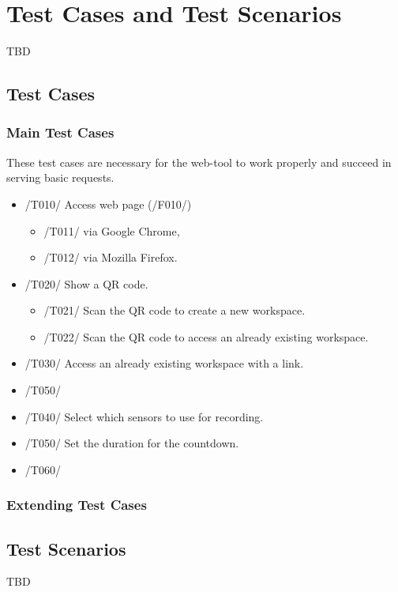 \section{Test Cases and Test Scenarios}
TBD
\subsection{Test Cases}
\subsubsection{Main Test Cases}
These test cases are necessary for the web-tool to work properly and succeed in serving
basic requests.
\begin{itemize}
    \item /T010/ Access web page (/F010/)
    \begin{itemize}
        \item /T011/ via Google Chrome,
        \item /T012/ via Mozilla Firefox.
    \end{itemize}
    \item /T020/ Show a QR code.
    \begin{itemize}
        \item /T021/ Scan the QR code to create a new workspace. %
        \item /T022/ Scan the QR code to access an already existing workspace. %
    \end{itemize}
    \item /T030/ Access an already existing workspace with a link.
    \item /T050/ 
    \item /T040/ Select which sensors to use for recording.
    \item /T050/ Set the duration for the countdown.
    \item /T060/ 
\end{itemize}
\subsubsection{Extending Test Cases}
\subsection{Test Scenarios}
TBD
